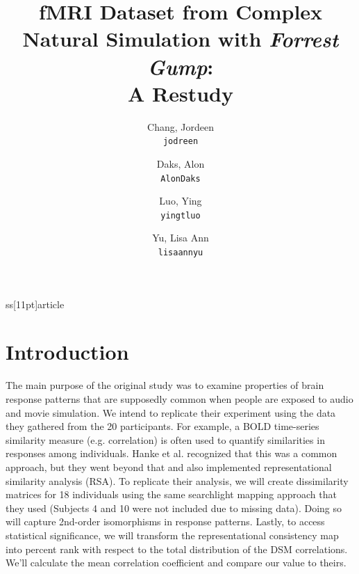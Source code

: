 ss[11pt]{article}

\usepackage[margin=0.75in]{geometry}
\usepackage{graphicx}
\graphicspath{ {images/} }

\title{fMRI Dataset from Complex Natural Simulation with \emph{Forrest Gump}: \\A Restudy}
\author{
  Chang, Jordeen\\
  \texttt{jodreen}
  \and
  Daks, Alon\\
  \texttt{AlonDaks}
  \and
  Luo, Ying\\
  \texttt{yingtluo}
  \and
  Yu, Lisa Ann\\
  \texttt{lisaannyu}
}




\maketitle


\section{Introduction}

The main purpose of the original study was to examine properties of brain
response patterns that are supposedly common when people are exposed to audio
and movie simulation. We intend to replicate their experiment using the data
they gathered from the 20 participants. For example, a BOLD time-series
similarity measure (e.g. correlation) is often used to quantify similarities
in responses among individuals. Hanke et al. recognized that this was a common
approach, but they went beyond that and also implemented representational
similarity analysis  (RSA). To replicate their analysis, we will create 
dissimilarity matrices for 18 individuals using the same searchlight mapping 
approach that they used (Subjects 4 and 10 were not included due to missing 
data). Doing so will capture 2nd-order isomorphisms in response patterns. 
Lastly, to access statistical significance, we will transform the 
representational consistency map into percent rank with respect to the total 
distribution of the DSM correlations. We'll calculate the mean correlation 
coefficient and compare our value to theirs.

